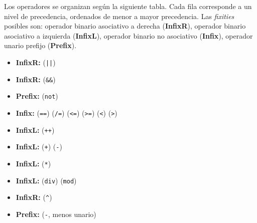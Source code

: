 \documentclass{article}
\begin{document}
Los operadores se organizan seg\'un la siguiente tabla.
Cada fila corresponde a un nivel de precedencia, ordenados de menor a mayor precedencia.
Las {\em fixities} posibles son:
operador binario asociativo a derecha ({\bf InfixR}),
operador binario asociativo a izquierda ({\bf InfixL}),
operador binario no asociativo ({\bf Infix}),
operador unario prefijo ({\bf Prefix}).

\begin{itemize}
\item {\bf InfixR:}  (\texttt{||})
\item {\bf InfixR:}  (\texttt{\&\&})
\item {\bf Prefix:}  (\texttt{not})
\item {\bf Infix:}
   (\texttt{==})
   (\texttt{/=})
   (\texttt{<=})
   (\texttt{>=})
   (\texttt{<})
   (\texttt{>})
\item {\bf InfixL:}
   (\texttt{++})
\item {\bf InfixL:}
   (\texttt{+})
   (\texttt{-})
\item {\bf InfixL:}
   (\texttt{*})
\item {\bf InfixL:}
   (\texttt{div})
   (\texttt{mod})
\item {\bf InfixR:}
   (\texttt{\^})
\item {\bf Prefix:}
   (\texttt{-}, menos unario)
\end{itemize}
\end{document}
